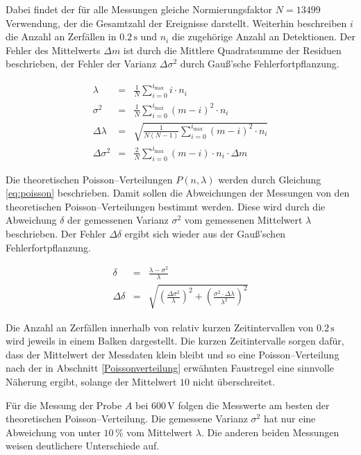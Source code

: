 \documentclass[12pt,a4paper]{scrartcl}
\numberwithin{equation}{section} %
\begin{document}
Dabei findet der für alle Messungen gleiche Normierungsfaktor $N = 13499$ Verwendung, der die Gesamtzahl der Ereignisse darstellt. Weiterhin beschreiben $i$ die Anzahl an Zerfällen in $0.2 \mathrm{\, s}$ und $n_i$ die zugehörige Anzahl an Detektionen. Der Fehler des Mittelwerts $\Delta m$ ist durch die Mittlere Quadratsumme der Residuen beschrieben, der Fehler der Varianz $\Delta \sigma^2$ durch Gauß'sche Fehlerfortpflanzung.

\begin{eqnarray}
	\lambda &=& \frac{1}{N} \sum_{i=0}^{i_\mathrm{max}} i \cdot n_i \\
	\sigma^2 &=& \frac{1}{N} \sum_{i=0}^{i_\mathrm{max}} (m - i)^2 \cdot n_i \\
	\Delta \lambda &=& \sqrt{\frac{1}{N (N-1)} \sum_{i=0}^{i_\mathrm{max}} (m - i)^2 \cdot n_i} \\
	\Delta \sigma^2 &=& \frac{2}{N} \sum_{i=0}^{i_\mathrm{max}} (m - i) \cdot n_i \cdot \Delta m
\end{eqnarray}

\noindent
Die theoretischen Poisson--Verteilungen $P(n, \lambda)$ werden durch Gleichung \eqref{eq:poisson} beschrieben. Damit sollen die Abweichungen der Messungen von den theoretischen Poisson--Verteilungen bestimmt werden. Diese wird durch die Abweichung $\delta$ der gemessenen Varianz $\sigma^2$ vom gemessenen Mittelwert $\lambda$ beschrieben. Der Fehler $\Delta \delta$ ergibt sich wieder aus der Gauß'schen Fehlerfortpflanzung.

\begin{eqnarray}
	\delta &=& \frac{\lambda - \sigma^2}{\lambda} \\
	\Delta \delta &=& \sqrt{\left(\frac{\Delta \sigma^2}{\lambda}\right)^2 + \left(\frac{\sigma^2 \cdot \Delta \lambda}{\lambda^2}\right)^2}
\end{eqnarray}

\noindent
Die Anzahl an Zerfällen innerhalb von relativ kurzen Zeitintervallen von $0.2 \mathrm{\,s}$ wird jeweils in einem Balken dargestellt. Die kurzen Zeitintervalle sorgen dafür, dass der Mittelwert der Messdaten klein bleibt und so eine Poisson--Verteilung nach der in Abschnitt \ref{Poissonverteilung} erwähnten Faustregel eine sinnvolle Näherung ergibt, solange der Mittelwert $10$ nicht überschreitet.

Für die Messung der Probe $A$ bei $600 \mathrm{\, V}$ folgen die Messwerte am besten der theoretischen Poisson--Verteilung. Die gemessene Varianz $\sigma^2$ hat nur eine Abweichung von unter $10 \mathrm{\, \%}$ vom Mittelwert $\lambda$. Die anderen beiden Messungen weisen deutlichere Unterschiede auf.
\end{document}
